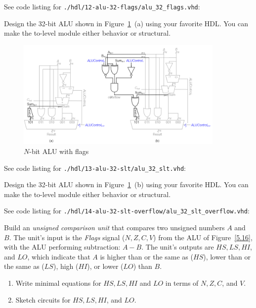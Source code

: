 \documentclass[12pt]{article}
\newenvironment{ex}[2][Exercise]{\begin{trivlist}
		\item[\hskip \labelsep {\bfseries #1}\hskip \labelsep {\bfseries #2.}]}{\end{trivlist}}
\newenvironment{sol}[1][Solution]{\begin{trivlist}
		\item[\hskip \labelsep {\bfseries #1:}]}{\end{trivlist}}
\begin{document}
\begin{sol}
	See code listing for \texttt{./hdl/12-alu-32-flags/alu\_32\_flags.vhd}:
	
\end{sol}

\begin{ex}{5.13}
	Design the 32-bit ALU shown in Figure~\ref{n-bit-ALU-set-if-less-than}~(a) 
	using your favorite HDL. You can make the to-level module either behavior or structural.
	\begin{figure}
		\centering
		\includegraphics[width=0.9\textwidth]{n-bit-ALU-set-if-less-than}
		\caption{$N$-bit ALU with flags}
		\label{n-bit-ALU-set-if-less-than}
	\end{figure}
\end{ex}

\begin{sol}
	See code listing for \texttt{./hdl/13-alu-32-slt/alu\_32\_slt.vhd}:
	
\end{sol}

\begin{ex}{5.14}
	Design the 32-bit ALU shown in Figure~\ref{n-bit-ALU-set-if-less-than}~(b)  using your favorite HDL.
	You can make the to-level module either behavior or structural.
\end{ex}

\begin{sol}
	See code listing for
	\texttt{./hdl/14-alu-32-slt-overflow/alu\_32\_slt\_overflow.vhd}:
	
\end{sol}

\begin{ex}{5.19}
	Build an \emph{unsigned comparison unit} that compares two unsigned numbers $A$ and $B$.
	The unit's input is the \emph{Flags} signal ($N, Z, C, V$) from the ALU of
	Figure~\ref{5.16}, with the ALU performing subtraction: $A-B$. The unit's outputs
	are $HS, LS, HI$, and $LO$, which indicate that $A$ is higher than or the same as
	($HS$), lower than or the same as ($LS$), high ($HI$), or lower ($LO$) than $B$.
	\begin{enumerate}[label=(\alph*)]
		\item Write minimal equations for $HS, LS, HI$ and $LO$ in terms of $N, Z, C$,
		and $V$.
		\item Sketch circuits for $HS,LS,HI$, and $LO$.
	\end{enumerate}
\end{ex}
\end{document}
